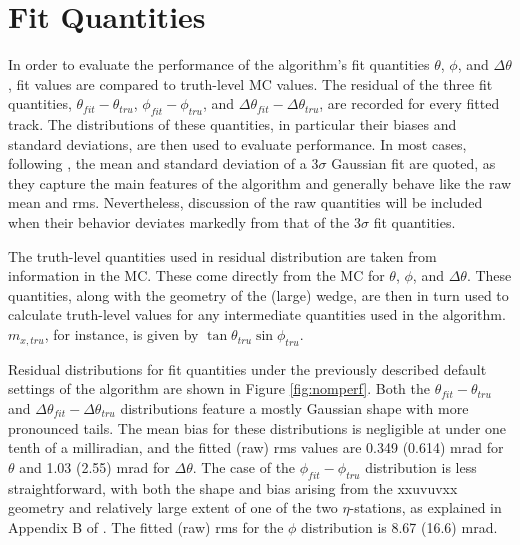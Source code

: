 \section{Fit Quantities}
In order to evaluate the performance of the algorithm's fit quantities $\theta$, $\phi$, and $\Delta\theta$, fit values are compared to truth-level MC values.  The residual of the three fit quantities, $\theta_{fit}-\theta_{tru}$, $\phi_{fit}-\phi_{tru}$, and $\Delta\theta_{fit}-\Delta\theta_{tru}$, are recorded for every fitted track.  The distributions of these quantities, in particular their biases and standard deviations, are then used to evaluate performance.  In most cases, following \cite{blcnote}, the mean and standard deviation of a 3$\sigma$ Gaussian fit are quoted, as they capture the main features of the algorithm and generally behave like the raw mean and rms.  Nevertheless, discussion of the raw quantities will be included when their behavior deviates markedly from that of the 3$\sigma$ fit quantities.

The truth-level quantities used in residual distribution are taken from information in the MC.  These come directly from the MC for $\theta$, $\phi$, and $\Delta\theta$.  These quantities, along with the geometry of the (large) wedge, are then in turn used to calculate truth-level values for any intermediate quantities used in the algorithm.  $m_{x,tru}$, for instance, is given by $\tan\theta_{tru}\sin\phi_{tru}$.

Residual distributions for fit quantities under the previously described default settings of the algorithm are shown in Figure \ref{fig:nomperf}.  Both the $\theta_{fit}-\theta_{tru}$ and $\Delta\theta_{fit}-\Delta\theta_{tru}$ distributions feature a mostly Gaussian shape with more pronounced tails.  The mean bias for these distributions is negligible at under one tenth of a milliradian, and the fitted (raw) rms values are 0.349 (0.614) mrad for $\theta$ and 1.03 (2.55) mrad for $\Delta\theta$.  The case of the $\phi_{fit}-\phi_{tru}$ distribution is less straightforward, with both the shape and bias arising from the xxuvuvxx geometry and relatively large extent of one of the two $\eta$-stations, as explained in Appendix B of \cite{misalnote}.  The fitted (raw) rms for the $\phi$ distribution is 8.67 (16.6) mrad.

